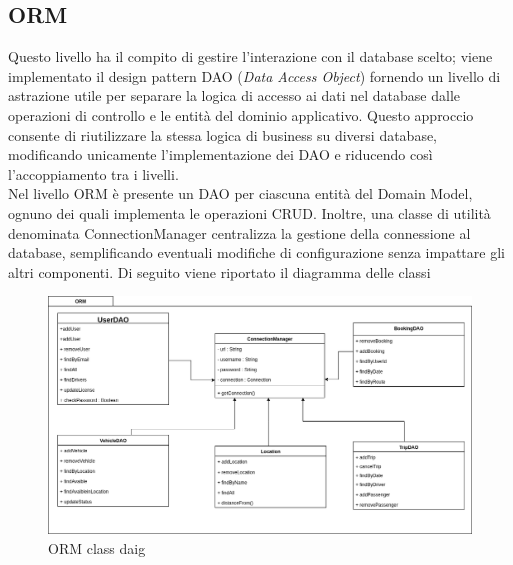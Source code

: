 \subsection{ORM}\label{subsec:ORM}
Questo livello ha il compito di gestire l'interazione con il database scelto; viene implementato il design pattern DAO (\textit{Data Access Object}) fornendo un livello di astrazione utile per separare la logica di accesso ai dati nel database dalle operazioni di controllo e le entità del dominio applicativo.
Questo approccio consente di riutilizzare la stessa logica di business su diversi database, modificando unicamente l’implementazione dei DAO e riducendo così l’accoppiamento tra i livelli.\\
Nel livello ORM è presente un DAO per ciascuna entità del Domain Model, ognuno dei quali implementa le operazioni CRUD. Inoltre, una classe di utilità denominata ConnectionManager centralizza la gestione della connessione al database, semplificando eventuali modifiche di configurazione senza impattare gli altri componenti.
Di seguito viene riportato il diagramma delle classi
\begin{figure}[H]
    \centering
    \includegraphics[width=1\linewidth]{Images/ORM_diag.png}
    \caption{ORM class daig}
    \label{fig:ORMdiag}
\end{figure}
